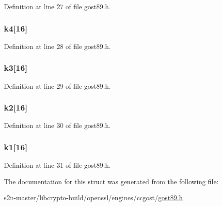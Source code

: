 Definition at line 27 of file gost89.\+h.

\subsubsection[{\texorpdfstring{k4}{k4}}]{ k4\mbox{[}16\mbox{]}}\hypertarget{structgost__subst__block_a17ca61200a998105efcb2f0b6fd468ac}{}\label{structgost__subst__block_a17ca61200a998105efcb2f0b6fd468ac}


Definition at line 28 of file gost89.\+h.

\subsubsection[{\texorpdfstring{k3}{k3}}]{ k3\mbox{[}16\mbox{]}}\hypertarget{structgost__subst__block_a52059b620bae96e24900fb0257130604}{}\label{structgost__subst__block_a52059b620bae96e24900fb0257130604}


Definition at line 29 of file gost89.\+h.

\subsubsection[{\texorpdfstring{k2}{k2}}]{ k2\mbox{[}16\mbox{]}}\hypertarget{structgost__subst__block_a2fac7da5cfefcadf8882002dc4c6f631}{}\label{structgost__subst__block_a2fac7da5cfefcadf8882002dc4c6f631}


Definition at line 30 of file gost89.\+h.

\subsubsection[{\texorpdfstring{k1}{k1}}]{ k1\mbox{[}16\mbox{]}}\hypertarget{structgost__subst__block_a6b68592eed24975c71c18fe7402b82e1}{}\label{structgost__subst__block_a6b68592eed24975c71c18fe7402b82e1}


Definition at line 31 of file gost89.\+h.



The documentation for this struct was generated from the following file\+:\begin{DoxyCompactItemize}
\item 
s2n-\/master/libcrypto-\/build/openssl/engines/ccgost/\hyperlink{gost89_8h}{gost89.\+h}\end{DoxyCompactItemize}

